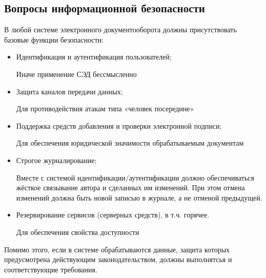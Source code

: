 \subsection{Вопросы информационной безопасности} \label{review_security}

В любой системе электронного документооборота должны присутствовать базовые функции безопасности:
\begin{itemize}
	\item Идентификация и аутентификация пользователей;

	Иначе применение СЭД бессмысленно
	\item Защита каналов передачи данных;

	Для противодействия атакам типа «человек посередине»
	\item Поддержка средств добавления и проверки электронной подписи;

	Для обеспечения юридической значимости обрабатываемым документам
	\item Строгое журналирование;

	Вместе с системой идентификации/аутентификации должно обеспечиваться жёсткое связывание автора и сделанных им изменений. При этом отмена изменений должна быть новой записью в журнале, а не отменой предыдущей.
	\item Резервирование сервисов (серверных средств), в т.ч. горячее.

	Для обеспечения свойства доступности
\end{itemize}

\vspace{\baselineskip}
Помимо этого, если в системе обрабатываются данные, защита которых предусмотрена действующим законодательством, должны выполнятсья и соответствующие требования.
